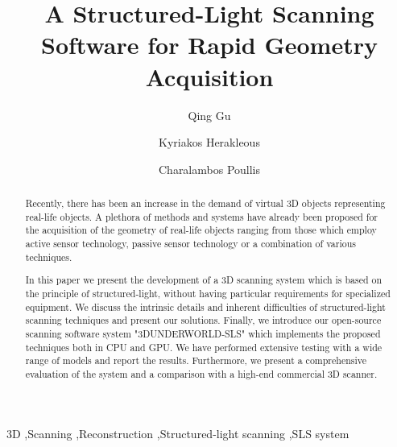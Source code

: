 \documentclass[final,12pt,3p]{elsarticle}
\begin{document}
\begin{frontmatter}

\title{A Structured-Light Scanning Software for Rapid Geometry Acquisition}

\author[label1]{Qing Gu}

\author[label2]{Kyriakos Herakleous}

\author[label3]{Charalambos Poullis}
\address[label1, label2, label3]{Immersive and Creative Technologies Lab, Department of Computer Science and Software Engineering, Concordia University}



\begin{abstract}
Recently, there has been an increase in the demand of virtual 3D objects representing real-life objects. A plethora of methods and systems have already been proposed for the acquisition of the geometry of real-life objects ranging from those which employ active sensor technology, passive sensor technology or a combination of various techniques. 

In this paper we present the development of a 3D scanning system which is based on the principle of structured-light, without having particular requirements for specialized equipment. We discuss the intrinsic details and inherent difficulties of structured-light scanning techniques and present our solutions. Finally, we introduce our open-source scanning software system "3DUNDERWORLD-SLS" which implements the proposed techniques both in CPU and GPU. We have performed extensive testing with a wide range of models and report the results. Furthermore, we present a comprehensive evaluation of the system and a comparison with a high-end commercial 3D scanner.
\end{abstract}

\begin{keyword}
3D \sep Scanning \sep Reconstruction \sep Structured-light scanning \sep SLS system
\end{keyword}

\end{frontmatter}

\end{document}
